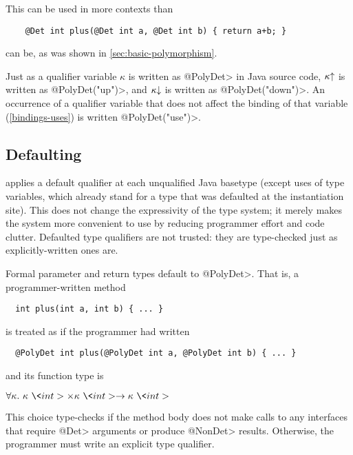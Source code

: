 This can be used in more contexts than

\begin{verbatim}
    @Det int plus(@Det int a, @Det int b) { return a+b; }
\end{verbatim}

\noindent
can be, as was shown in \cref{sec:basic-polymorphism}.


Just as a qualifier variable $\kappa$ is written as \<@PolyDet> in Java
source code, $\up{\kappa}$ is written as \<@PolyDet("up")>, and
$\down{\kappa}$ is written as \<@PolyDet("down")>.  An occurrence of a
qualifier variable that does not affect the binding of that variable
(\cref{bindings-uses}) is written \<@PolyDet("use")>.



\subsection{Defaulting}\label{defaulting}

\TheDeterminismChecker applies a default qualifier at each unqualified Java
basetype (except uses of type variables, which already stand for a type that was
defaulted at the instantiation site).
This does not change the expressivity of the type system; it merely makes
the system more convenient to use by reducing programmer effort and code clutter.
Defaulted type qualifiers are not trusted:  they are type-checked just as
explicitly-written ones are.

Formal parameter and return types default to \<@PolyDet>.  That is, a
programmer-written method

\begin{Verbatim}
  int plus(int a, int b) { ... }
\end{Verbatim}

\noindent
is treated as if the programmer had written

\begin{Verbatim}
  @PolyDet int plus(@PolyDet int a, @PolyDet int b) { ... }
\end{Verbatim}

\noindent
and its function type is

$\forallt{\kappa}  \kappa\ \<int> \times \kappa\ \<int> \rightarrow \kappa\ \<int>$

\noindent
This choice type-checks if the method body does not make calls to any
interfaces that require \<@Det> arguments or produce \<@NonDet> results.
Otherwise, the programmer must write an explicit type qualifier.

